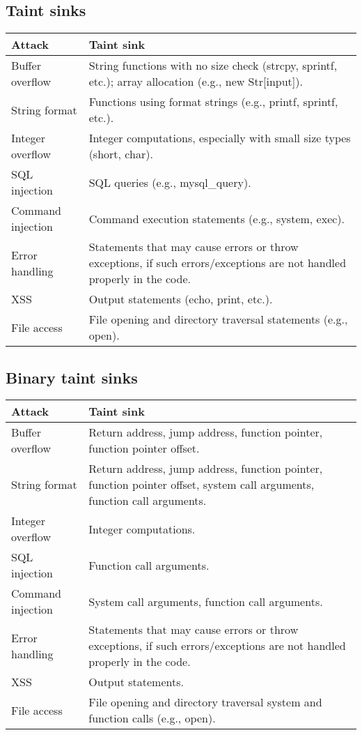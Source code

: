 \documentclass[a4paper, 10pt, titlepage]{article}
\begin{document}
\subsection{Taint sinks}
\begin{tabular}{|l|p{10cm}|} \hline
Attack & Taint sink \\ \hline
Buffer overflow & String functions with no size check (strcpy, sprintf, etc.); array allocation (e.g., new Str[input]). \\\hline
String format & Functions using format strings (e.g., printf, sprintf, etc.).\\\hline
Integer overflow & Integer computations, especially with small size types (short, char).\\\hline
SQL injection & SQL queries (e.g., mysql\_query).\\\hline
Command injection & Command execution statements (e.g., system, exec).\\\hline
Error handling & Statements that may cause errors or throw exceptions, if such errors/exceptions are not handled properly in the code.\\\hline
XSS & Output statements (echo, print, etc.).\\\hline
File access & File opening and directory traversal statements (e.g., open). \\\hline
\end{tabular}
\subsection{Binary taint sinks}
\begin{tabular}{|l|p{10cm}|} \hline
Attack & Taint sink \\ \hline
Buffer overflow & Return address, jump address, function pointer, function pointer offset. \\\hline
String format & Return address, jump address, function pointer, function pointer offset, system call arguments, function call arguments. \\\hline
Integer overflow & Integer computations. \\\hline
SQL injection & Function call arguments. \\\hline
Command injection & System call arguments, function call arguments. \\\hline
Error handling & Statements that may cause errors or throw exceptions, if such errors/exceptions are not handled properly in the code. \\\hline
XSS & Output statements. \\\hline
File access & File opening and directory traversal system and function calls (e.g., open). \\\hline
\end{tabular}
\end{document}
